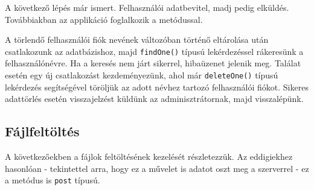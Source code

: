 A következő lépés már ismert. Felhasználói adatbevitel, madj pedig elküldés. Továbbiakban az applikáció foglalkozik a metódussal.

A törlendő felhasználói fiók nevének változóban történő eltárolása után csatlakozunk az adatbázishoz, majd \texttt{findOne()} típusú lekérdezéssel rákeresünk a felhasználónévre. Ha a keresés nem járt sikerrel, hibaüzenet jelenik meg. Találat esetén egy új csatlakozást kezdeményezünk, ahol már \texttt{deleteOne()} típusú lekérdezés segítségével töröljük az adott névhez tartozó felhasználói fiókot. Sikeres adattörlés esetén visszajelzést küldünk az adminisztrátornak, majd visszalépünk.


\subsection{Fájlfeltöltés}

A következőekben a fájlok feltöltésének kezelését részletezzük. Az eddigiekhez hasonlóan - tekintettel arra, hogy ez a művelet is adatot oszt meg a szerverrel - ez a metódus is \texttt{post} típusú.\\

\\

